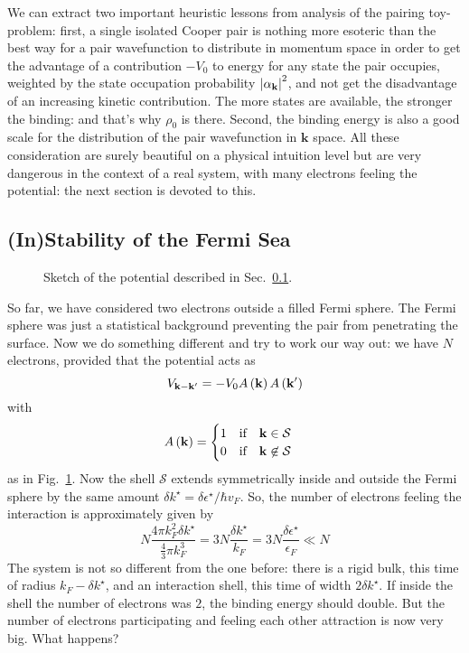 We can extract two important heuristic lessons from analysis of the pairing toy-problem: first, a single isolated Cooper pair is nothing more esoteric than the best way for a pair wavefunction to distribute in momentum space in order to get the advantage of a contribution $-V_0$ to energy for any state the pair occupies, weighted by the state occupation probability $\abs{\alpha_\mathbf{k}}^2$, and not get the disadvantage of an increasing kinetic contribution. The more states are available, the stronger the binding: and that's why $\rho_0$ is there. Second, the binding energy is also a good scale for the distribution of the pair wavefunction in $\mathbf{k}$ space. All these consideration are surely beautiful on a physical intuition level but are very dangerous in the context of a real system, with many electrons feeling the potential: the next section is devoted to this.

\subsection{(In)Stability of the Fermi Sea}\label{subsec:(in)stability of the fermi sea}

\begin{figure}
	\centering
	
	\caption{Sketch of the potential described in Sec.~\ref{subsec:(in)stability of the fermi sea}.}
	\label{fig:fermi sphere and shell extended}
\end{figure}

So far, we have considered two electrons outside a filled Fermi sphere. The Fermi sphere was just a statistical background preventing the pair from penetrating the surface. Now we do something different and try to work our way out: we have $N$ electrons, provided that the potential acts as
\[
	V_{\mathbf{k}-\mathbf{k}'} = -V_0 A\left({\mathbf{k}}\right) A\left({\mathbf{k}'}\right)
\]
with
\[
	A\lrR{\mathbf{k}} = \begin{cases}
		1 \qq{if} \mathbf{k} \in \mathcal{S} \\
		0 \qq{if} \mathbf{k} \not\in \mathcal{S}
	\end{cases}
\]
as in Fig.~\ref{fig:fermi sphere and shell extended}. Now the shell $\mathcal{S}$ extends symmetrically inside and outside the Fermi sphere by the same amount $\delta k^\star = \delta \epsilon^\star / \hbar v_F$. So, the number of electrons feeling the interaction is approximately given by
\[
	N \frac{4\pi k_F^2 \delta k^\star}{\displaystyle \frac{4}{3} \pi k_F^3} = 3N \frac{\delta k^\star}{k_F} = 3N \frac{\delta \epsilon^\star}{\epsilon_F} \ll N
\]
The system is not so different from the one before: there is a rigid bulk, this time of radius $k_F - \delta k^\star$, and an interaction shell, this time of width $2 \delta k^\star$. If inside the shell the number of electrons was $2$, the binding energy should double. But the number of electrons participating and feeling each other attraction is now very big. What happens?

